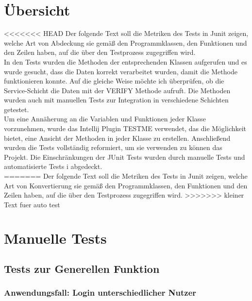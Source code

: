 \documentclass[enabledeprecatedfontcommands,fontsize=12pt,paper=a4,twoside]{scrartcl}
\begin{document}

\newpage
\section{Übersicht}

<<<<<<< HEAD
Der folgende Text soll die Metriken des Tests in Junit zeigen, welche Art von Abdeckung sie gemäß den Programmklassen, den Funktionen und den Zeilen haben, auf die über den Testprozess zugegriffen wird.\\

In den Tests wurden die Methoden der entsprechenden Klassen aufgerufen und es wurde gesucht, dass die Daten korrekt verarbeitet wurden, damit die Methode funktionieren konnte. Auf die gleiche Weise möchte ich überprüfen, ob die Service-Schicht die Daten mit der VERIFY Methode aufruft. Die Methoden wurden auch mit manuellen Tests zur Integration in verschiedene Schichten getestet.\\

Um eine Annäherung an die Variablen und Funktionen jeder Klasse vorzunehmen, wurde das Intellij Plugin TESTME verwendet, das die Möglichkeit bietet, eine Ansicht der Methoden in jeder Klasse zu erstellen. Anschließend wurden die Tests vollständig reformiert, um sie verwenden zu können das Projekt. Die Einschränkungen der JUnit Tests wurden durch manuelle Tests und automatisierte Tests i abgedeckt.\\
=======
Der folgende Text soll die Metriken des Tests in Junit zeigen, welche Art von Konvertierung sie gemäß den Programmklassen, den Funktionen und den Zeilen haben, auf die über den Testprozess zugegriffen wird.
>>>>>>> kleiner Text fuer auto test


\newpage
\section{Manuelle Tests}


\subsection{Tests zur Generellen Funktion}

\subsubsection{Anwendungsfall: Login unterschiedlicher Nutzer}
\end{document}
